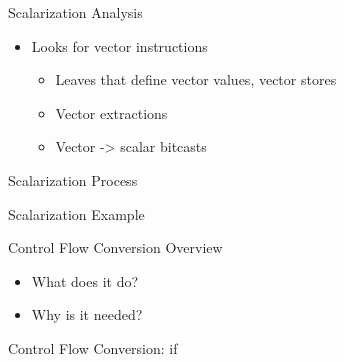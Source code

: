 
\begin{frame}{Scalarization Analysis}

\begin{itemize}
    \item Looks for vector instructions
    \begin{itemize}
        \item Leaves that define vector values, vector stores
        \item Vector extractions
        \item Vector -> scalar bitcasts
    \end{itemize}
    
\end{itemize}

\end{frame}


\begin{frame}{Scalarization Process}


\end{frame}


\begin{frame}{Scalarization Example}


\end{frame}



\begin{frame}{Control Flow Conversion Overview}

\begin{itemize}
    \item What does it do?
    \item Why is it needed?
\end{itemize}

\end{frame}


\begin{frame}{Control Flow Conversion: if}

\end{frame}

